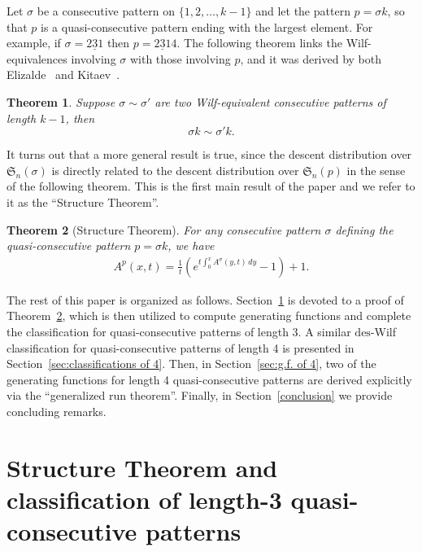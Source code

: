 \documentclass[11pt,reqno]{amsart}
\numberwithin{equation}{section}
\theoremstyle{plain}
\newtheorem{theorem}{Theorem}[section]
\theoremstyle{definition}
\renewcommand{\S}{\mathfrak{S}}
\def\des{\mathrm{des}}
\begin{document}
Let $\sigma$ be a consecutive pattern on $\{1,2,\ldots,k-1\}$ and let the pattern $p=\sigma k$,
so that $p$ is a quasi-consecutive pattern ending with the largest element. For example, if $\sigma=\underline{231} $ then $p=\underline{231}4$. The following theorem links the Wilf-equivalences involving $\sigma$ with those involving $p$, and it was derived by both Elizalde~\cite{eli06} and Kitaev~\cite{kit05}. 
\begin{theorem}\label{thm:eli-kit}
Suppose $\sigma\sim\sigma'$ are two Wilf-equivalent consecutive patterns of length $k-1$, then
$$\sigma k\sim\sigma'k.$$
\end{theorem}

It turns out that a more general result is true, since the descent distribution over $\S_n(\sigma)$ is directly related to the descent distribution over $\S_n(p)$ in the sense of the following theorem. This is the first main result of the paper and we refer to it as the ``Structure Theorem''.

\begin{theorem}[Structure Theorem]\label{structure thm}
    For any consecutive pattern $\sigma$ defining the quasi-consecutive pattern $p=\sigma k$, we have 
    \begin{align}
    \label{id:struc}
    A^p(x,t) = \frac{1}{t} (e^{t \int_{0}^{x} A^{\sigma}(y,t) \,dy}-1) +1.
    \end{align}
\end{theorem}



The rest of this paper is organized as follows. Section~\ref{sec:structure theorem} is devoted to a proof of Theorem~\ref{structure thm}, which is then utilized to compute generating functions and complete the classification for quasi-consecutive patterns of length 3. A similar $\des$-Wilf classification for quasi-consecutive patterns of length 4 is presented in Section~\ref{sec:classifications of 4}. Then, in Section~\ref{sec:g.f. of 4}, two of the generating functions for length 4 quasi-consecutive patterns are derived explicitly via the ``generalized run theorem''. Finally, in Section~\ref{conclusion} we provide concluding remarks.




\section{Structure Theorem and classification of length-3 quasi-consecutive patterns}\label{sec:structure theorem}
\end{document}
